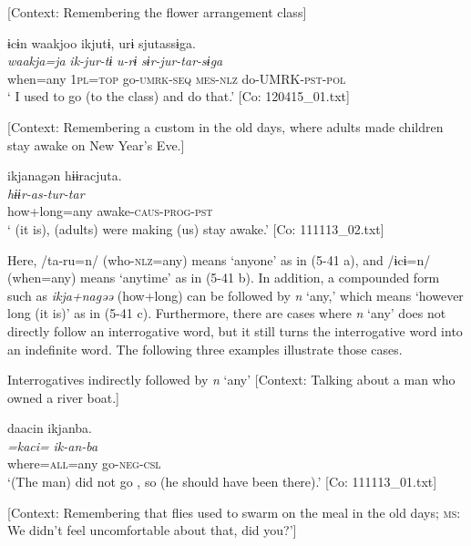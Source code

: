  \ex \label{ex:5:b} [Context: Remembering the flower arrangement class]

\glll  ɨcɨn  waakjoo  ikjutɨ,  urɨ  sjutassɨga.\\
\textit{}  \textit{waakja=ja}  \textit{ik-jur-tɨ}  \textit{u-rɨ}  \textit{sɨr-jur-tar-sɨga}\\
when=any  1\textsc{pl}=\textsc{top}  go-\textsc{umrk}-\textsc{seq}  \textsc{mes}-\textsc{nlz}  do-UMRK-\textsc{pst}-\textsc{pol}\\
\glt ‘ I used to go (to the class) and do that.’ [Co: 120415\_01.txt]

 \ex \label{ex:5:c} [Context: Remembering a custom in the old days, where adults made children stay awake on New Year’s Eve.]

\glll  ikjanagən  hɨɨracjuta.\\
\textit{}  \textit{hɨɨr-as-tur-tar}\\
how+long=any  awake-\textsc{caus}-\textsc{prog}-\textsc{pst}\\
\glt ‘ (it is), (adults) were making (us) stay awake.’ [Co: 111113\_02.txt]
\z
\z

Here, /ta-ru=n/ (who-\textsc{nlz}=any) means ‘anyone’ as in (5-41 a), and /ɨcɨ=n/ (when=any) means ‘anytime’ as in (5-41 b). In addition, a compounded form such as \textit{ikja+nagəə} (how+long) can be followed by \textit{n} ‘any,’ which means ‘however long (it is)’ as in (5-41 c). Furthermore, there are cases where \textit{n} ‘any’ does not directly follow an interrogative word, but it still turns the interrogative word into an indefinite word. The following three examples illustrate those cases.

\ea \label{ex:5:42}   Interrogatives indirectly followed by \textit{n} ‘any’
 \ea \label{ex:5:42a} [Context: Talking about a man who owned a river boat.]

\glll  daacin  ikjanba.\\
\textit{=kaci=}  \textit{ik-an-ba}\\
where=\textsc{all}=any  go-\textsc{neg}-\textsc{csl}\\
\glt ‘(The man) did not go , so (he should have been there).’ [Co: 111113\_01.txt]

 \ex \label{ex:5:b} [Context: Remembering that flies used to swarm on the meal in the old days; \textsc{ms}: We didn’t feel uncomfortable about that, did you?’]

